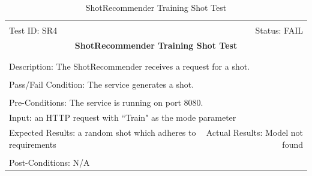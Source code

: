 \documentclass[11pt]{article}
\begin{document}
\begin{center}
\begin{table}[H]
\begin{tabular}{|l r|}\hline&\\[-2mm]
	Test ID: SR4	&Status: FAIL\\[-3mm]
	\multicolumn{2}{|c|}{\textbf{\large{ShotRecommender Training Shot Test}}}\\&\\\hline&\\[-3mm]
	\multicolumn{2}{|p{\textwidth}|}{Description: The ShotRecommender receives a request for a shot.}\\[1mm]\hline&\\[-3mm]
	\multicolumn{2}{|p{\textwidth}|}{Pass/Fail Condition: The service generates a shot.}\\[1mm]\hline&\\[-3mm]
	\multicolumn{2}{|p{\textwidth}|}{Pre-Conditions: The service is running on port 8080.}\\[4mm]
	\multicolumn{2}{|p{\textwidth}|}{Input: an HTTP request with ``Train" as the mode parameter}\\[2mm]\hline
	\multicolumn{1}{|p{0.49\textwidth}}{Expected Results: a random shot which adheres to requirements}	&\multicolumn{1}{|p{0.45\textwidth}|}{Actual Results: Model not found}\\\hline&\\[-3mm]
	\multicolumn{2}{|p{\textwidth}|}{Post-Conditions: N/A}\\\hline
\end{tabular}
\caption{ShotRecommender Training Shot Test}
\end{table}
\end{center}
\end{document}
